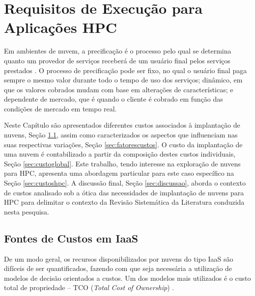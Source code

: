 \documentclass[tese,capa]{texufpel}
\begin{document}
\chapter{Requisitos de Execução para Aplicações HPC}\label{chap:reqhpc}

Em ambientes de nuvem, a precificação é o processo pelo qual se determina quanto um provedor de serviços receberá de um usuário final pelos serviços prestados \cite{al-roomiCloudComputingPricing2013}. O processo de precificação pode ser fixo, no qual o usuário final paga sempre o mesmo valor durante todo o tempo de uso dos serviços; dinâmico, em que os valores cobrados mudam com base em alterações de características; e dependente de mercado, que é quando o cliente é cobrado em função das condições de mercado em tempo real.

Neste Capítulo são apresentados diferentes custos associados à implantação de nuvens, Seção \ref{sec:fontescustos}, assim como caracterizados os aspectos que influenciam nas suas respectivas variações, Seção \ref{sec:fatorescustos}. O custo da implantação de uma nuvem é contabilizado a partir da composição destes custos individuais, Seção \ref{sec:custoglobal}. Este trabalho, tendo interesse na exploração de nuvens para HPC, apresenta uma abordagem particular para este caso específico na Seção \ref{sec:custoshpc}. A discussão final, Seção \ref{sec:discussao}, aborda o contexto de custos analisado sob a ótica das necessidades de implantação de nuvens para HPC para delimitar o contexto da Revisão Sistemática da Literatura conduzida nesta pesquisa.

\section{Fontes de Custos em IaaS}\label{sec:fontescustos}
De um modo geral, os recursos disponibilizados por nuvens do tipo IaaS são difíceis de ser quantificados, fazendo com que seja necessária a utilização de modelos de decisão orientados a custos. Um dos modelos mais utilizados é o custo total de propriedade -- TCO (\emph{Total Cost of Ownership}) \cite{strebelEconomicDecisionModel2010}.
\end{document}
